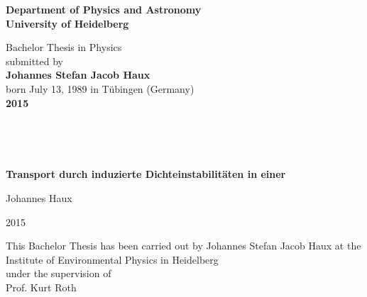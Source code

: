 \begin{titlepage}
\begin{center}
 
\Large\textbf{Department of Physics and Astronomy\\
University of Heidelberg}

\vspace{16cm}

\normalsize
Bachelor Thesis in Physics\\
submitted by \\
\vspace{0.5cm}
\Large\textbf{Johannes Stefan Jacob Haux}\\
\normalsize
\vspace{0.5cm}
born July 13, 1989 in Tübingen (Germany)\\
\vspace{0.5cm}
\Large\textbf{2015}
\normalsize

\clearpage
\thispagestyle{empty}

\newpage
\mbox{\,}
\newpage
{}%
\clearpage
\thispagestyle{empty}

\mbox{\,}

\vspace{2.5cm}

\Huge
\onehalfspacing

\textbf{Transport durch \COTm induzierte Dichteinstabilitäten in einer \HSC}

\normalsize
\singlespacing

\vspace{3cm}

Johannes Haux

2015


\vspace{7.5cm}

\normalsize
This Bachelor Thesis has been carried out by Johannes Stefan Jacob Haux at the\\
Institute of Environmental Physics in Heidelberg\\
under the supervision of\\
Prof. Kurt Roth

\vfill
\end{center}
\newpage
\mbox{\,}
\newpage
\end{titlepage}

\clearpage
{}